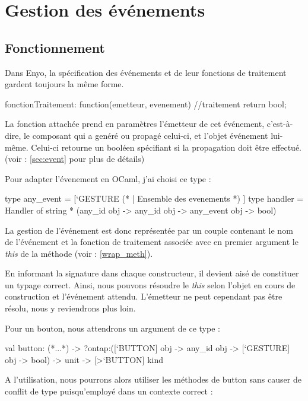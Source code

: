 \documentclass[11pt,a4paper]{report}
\begin{document}
\section{Gestion des événements}\label{gestevent}
\subsection{Fonctionnement}
Dans Enyo, la spécification des événements et de leur fonctions de traitement gardent toujours la même
forme.

\begin{JavaScript}
  fonctionTraitement: function(emetteur, evenement){
                          //traitement
                          return bool; }
\end{JavaScript}

La fonction attachée prend en paramètres l'émetteur de cet événement, c'est-à-dire, 
le composant qui a genéré ou propagé celui-ci, et l'objet événement lui-même.
Celui-ci retourne un booléen spécifiant si la propagation doit être effectué.
(voir : \ref{sec:event} pour plus de détails)

Pour adapter l'évenement en OCaml, j'ai choisi ce type :
\begin{OCaml}
  type any_event = [`GESTURE (* |  Ensemble des evenements *) ]
  type handler = Handler of string * (any_id obj -> any_id obj -> any_event obj -> bool)
\end{OCaml}

La gestion de l'événement est donc représentée par un couple contenant le nom de l'événement et la 
fonction de traitement associée avec en premier argument le \emph{this} de la méthode (voir : \ref{wrap_meth}).

En informant la signature dans chaque constructeur, il devient aisé de constituer un typage correct.
Ainsi, nous pouvons résoudre le \emph{this} selon l'objet en cours de construction et l'événement attendu.
L'émetteur ne peut cependant pas être résolu, nous y reviendrons plus loin.

Pour un bouton, nous attendrons un argument de ce type :

\begin{OCaml}
  val button:
    (*...*)
    -> ?ontap:([`BUTTON] obj -> any_id obj -> [`GESTURE] obj -> bool)
    -> unit -> [>`BUTTON] kind
\end{OCaml}

A l'utilisation, nous pourrons alors utiliser les méthodes de button sans causer de conflit de type 
puisqu'employé dans un contexte correct :
\end{document}
